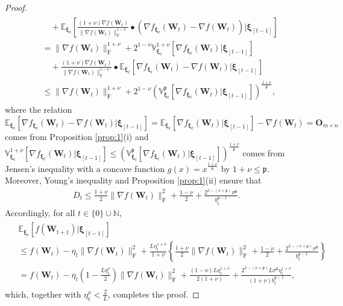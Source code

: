 \documentclass[twoside,11pt]{article}
\begin{document}
\begin{proof}
\begin{align}
\begin{split}
&\quad +
\mathbb{E}_{\bm{\xi}_t} \left[ \frac{(1 + \nu) \nabla f (\bm{W}_t)}{\|\nabla f (\bm{W}_t)\|_{\mathrm{F}}^{1 - \nu}}
\bullet (\nabla f_{\bm{\xi}_t} (\bm{W}_t) - \nabla f (\bm{W}_t)) \Bigg|\bm{\xi}_{[t-1]} \right]\\
&= 
\|\nabla f (\bm{W}_t) \|_{\mathrm{F}}^{1 + \nu}
+
2^{1 - \nu} \mathbb{V}_{\bm{\xi}_t}^{1 + \nu} \left[\nabla f_{\bm{\xi}_t} (\bm{W}_t)|\bm{\xi}_{[t-1]} \right]\\
&\quad +
\frac{(1 + \nu) \nabla f (\bm{W}_t)}{\|\nabla f (\bm{W}_t)\|_{\mathrm{F}}^{1 - \nu}}
\bullet 
\mathbb{E}_{\bm{\xi}_t} \left[ \nabla f_{\bm{\xi}_t} (\bm{W}_t) - \nabla f (\bm{W}_t) |\bm{\xi}_{[t-1]} \right]\\
&\leq \|\nabla f (\bm{W}_t) \|_{\mathrm{F}}^{1 + \nu}
+
2^{1 - \nu} 
\left( \mathbb{V}_{\bm{\xi}_t}^{\mathfrak{p}} \left[\nabla f_{\bm{\xi}_t} (\bm{W}_t)|\bm{\xi}_{[t-1]} \right] \right)^{\frac{1 + \nu}{\mathfrak{p}}},
\end{split}
\end{align}
where the relation $\mathbb{E}_{\bm{\xi}_t} [ \nabla f_{\bm{\xi}_t} (\bm{W}_t) - \nabla f (\bm{W}_t) |\bm{\xi}_{[t-1]} ] = \mathbb{E}_{\bm{\xi}_t} [ \nabla f_{\bm{\xi}_t} (\bm{W}_t)|\bm{\xi}_{[t-1]}] - \nabla f (\bm{W}_t) = \bm{O}_{m \times n}$ comes from Proposition \ref{prop:1}(i) and $\mathbb{V}_{\bm{\xi}_t}^{1 + \nu} [\nabla f_{\bm{\xi}_t} (\bm{W}_t)|\bm{\xi}_{[t-1]}] \leq ( \mathbb{V}_{\bm{\xi}_t}^{\mathfrak{p}} [\nabla f_{\bm{\xi}_t} (\bm{W}_t)|\bm{\xi}_{[t-1]} ])^{\frac{1 + \nu}{\mathfrak{p}}}$ comes from Jensen's inequality with a concave function $g (x) = x^{\frac{1 + \nu}{\mathfrak{p}}}$ by $1 + \nu \leq \mathfrak{p}$. Moreover, Young's inequality and Proposition \ref{prop:1}(ii) ensure that
\begin{align}\label{comp_d_t_1}
D_t \leq 
\frac{1 + \nu}{2} \| \nabla f (\bm{W}_t)\|_{\mathrm{F}}^2 + \frac{1 - \nu}{2}
+ \frac{2^{3 - (\nu + \mathfrak{p})}\sigma^{\mathfrak{p}}}{b_t^{\mathfrak{p}-1}}.
\end{align}
Accordingly, for all $t \in \{0\} \cup \mathbb{N}$, 
\begin{align}\label{ineq_sgd}
\begin{split}
&\mathbb{E}_{\bm{\xi}_t} \left[ f(\bm{W}_{t+1})|\bm{\xi}_{[t-1]} \right]\\
&\leq
f(\bm{W}_t)
- \eta_t \| \nabla f (\bm{W}_t)\|_{\mathrm{F}}^2
+ \frac{L \eta_t^{1 + \nu}}{1 + \nu}
\left\{ \frac{1 + \nu}{2} \| \nabla f (\bm{W}_t)\|_{\mathrm{F}}^2 + \frac{1 - \nu}{2}
+ \frac{2^{3 - (\nu + \mathfrak{p})}\sigma^{\mathfrak{p}}}{b_t^{\mathfrak{p}-1}} \right\}\\
&=
f(\bm{W}_t) - \eta_t \left( 1 - \frac{L \eta_t^\nu}{2}   \right) \| \nabla f (\bm{W}_t)\|_{\mathrm{F}}^2
+ \frac{(1 - \nu) L \eta_t^{1 + \nu}}{2 (1 + \nu)}
+ \frac{2^{3 - (\nu + \mathfrak{p})} L \sigma^{\mathfrak{p}} \eta_t^{1 + \nu}}{(1 + \nu) b_t^{\mathfrak{p}-1}},
\end{split}
\end{align}
which, together with $\eta_t^\nu < \frac{2}{L}$, completes the proof.
\end{proof}
\end{document}
